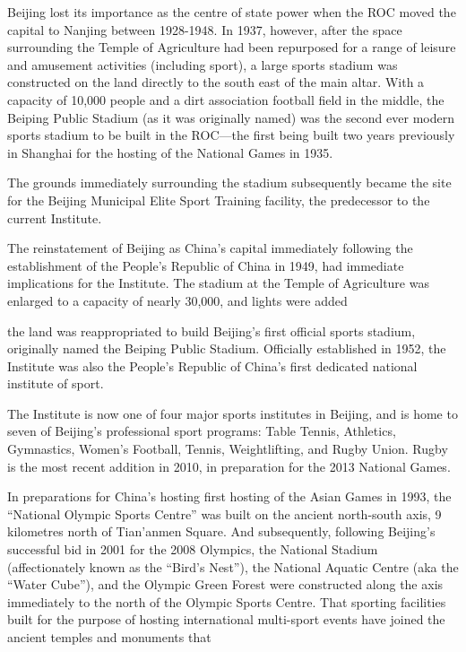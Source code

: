 Beijing lost its importance as the centre of state power when the ROC moved the capital to Nanjing between 1928-1948.  In 1937, however, after the space surrounding the Temple of Agriculture had been repurposed for a range of leisure and amusement activities (including sport), a large sports stadium was constructed on the land directly to the south east of the main altar.  With a capacity of 10,000 people and a dirt association football field in the middle, the Beiping Public Stadium (as it was originally named) was the second ever modern sports stadium to be built in the ROC---the first being built two years previously in Shanghai for the hosting of the National Games in 1935.


The grounds immediately surrounding the stadium subsequently became the site for the Beijing Municipal Elite Sport Training facility, the predecessor to the current Institute.


The reinstatement of Beijing as China's capital immediately following the establishment of the People's Republic of China in 1949, had immediate implications for the Institute.  The stadium at the Temple of Agriculture was enlarged to a capacity of nearly 30,000, and lights were added  




the land was reappropriated to build Beijing's first official sports stadium, originally named the Beiping Public Stadium.  Officially established in 1952, the Institute was also the People's Republic of China's first dedicated national institute of sport.




 The Institute is now one of four major sports institutes in Beijing, and is home to seven of Beijing's professional sport programs: Table Tennis, Athletics, Gymnastics, Women's Football, Tennis, Weightlifting, and Rugby Union.  Rugby is the most recent addition in 2010, in preparation for the 2013 National Games.








In preparations for China's hosting first hosting of the Asian Games in 1993, the ``National Olympic Sports Centre''  was built on the ancient north-south axis, 9 kilometres north of Tian'anmen Square. And subsequently, following Beijing's successful bid in 2001 for the 2008 Olympics, the National Stadium (affectionately known as the ``Bird's Nest''), the National Aquatic Centre (aka the ``Water Cube''), and the Olympic Green Forest were constructed along the axis immediately to the north of the Olympic Sports Centre.  That sporting facilities built for the purpose of hosting international multi-sport events have joined the ancient temples and monuments that


